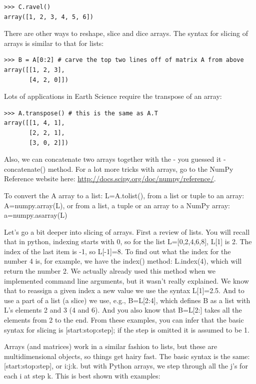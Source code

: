 \documentclass[11pt]{book}
\begin{document}
{{{{   { \color{blue} \begin{verbatim}
>>> C.ravel()
array([1, 2, 3, 4, 5, 6])
\end{verbatim}}

There are other ways to reshape, slice and dice arrays.
The syntax for slicing of arrays is similar to that for lists:
{ \color{blue} \begin{verbatim}
>>> B = A[0:2] # carve the top two lines off of matrix A from above
array([[1, 2, 3],
       [4, 2, 0]])
\end{verbatim}}

Lots of applications in Earth Science require the transpose of an array:
{ \color{blue} \begin{verbatim}
>>> A.transpose() # this is the same as A.T
array([[1, 4, 1],
       [2, 2, 1],
       [3, 0, 2]])
\end{verbatim}}

Also, we can concatenate two arrays together with the - you guessed it - {\color{blue}concatenate()} method.   For a lot more tricks with arrays, go to the NumPy Reference website here:  \url{http://docs.scipy.org/doc/numpy/reference/}.

To convert the {\color{blue}A} array to a list:   {\color{blue}L=A.tolist()},  from a list or tuple to an array:   {\color{blue}A=numpy.array(L)}, or from a list, a tuple or an array to a NumPy array:   {\color{blue}a=numpy.asarray(L)}

Let's go a bit deeper into slicing of arrays.  First a review of lists.   You will recall that in  python, indexing starts with 0, so for the list {\color{blue} L=[0,2,4,6,8], L[1]} is 2. The index of the last item is -1, so  {\color{blue}L[-1]}=8.  To find out what the index for the number 4 is, for example, we have the {\color{blue}index()} method:  {\color{blue}L.index(4}), which will return the number 2. We actually already used this method when we implemented command line arguments, but it wasn't really explained.   We know that to reassign a given index a new value we use the syntax {\color{blue}L[1]=2.5}.
And to use a part of a list (a slice) we use, e.g.,    {\color{blue}B=L[2:4]}, which  defines  {\color{blue}B} as a list with  {\color{blue}L}'s elements 2 and 3 (4 and 6).  And you also know that  {\color{blue}B=L[2:]} takes all the elements from 2 to the end.
From these examples, you can infer that the basic syntax for slicing is  {\color{blue}[start:stop:step]}; if the step is omitted it is assumed to be 1.

Arrays (and matrices) work in a similar fashion to lists, but these are multidimensional objects, so things get hairy fast.
The basic syntax is the same:  {\color{blue}[start:stop:step]},  or  {\color{blue}i:j:k}.   but with Python arrays, we step through all the  {\color{blue}j}'s for each  {\color{blue}i}  at step  {\color{blue}k}.  This is best shown with examples:


}}}}
\end{document}
